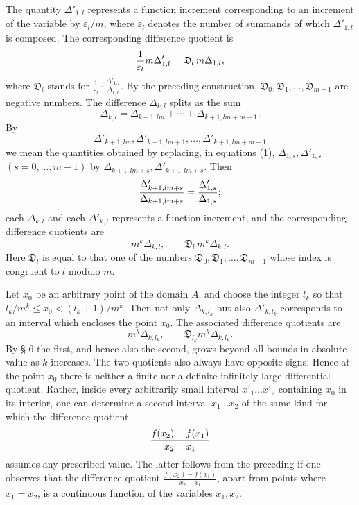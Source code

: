 The quantity $\Delta'_{1,l}$ represents a function increment corresponding to an increment of the variable by $\varepsilon_l/m$, where $\varepsilon_l$ denotes the number of summands of which $\Delta'_{1,l}$ is composed. The corresponding difference quotient is
\[
 {1\over\varepsilon_l}m\Delta'_{1,l}=\mathfrak D_l\,m\Delta_{1,l},
\]
where $\mathfrak D_l$ stands for $\frac1{\varepsilon_l}\cdot\frac{\Delta'_{1,l}}{\Delta_{1,l}}$. By the preceding construction, $\mathfrak D_0,\mathfrak D_1,\ldots,\mathfrak D_{m-1}$ are negative numbers. The difference $\Delta_{k,l}$ splits as the sum
\[
 \Delta_{k,l}=\Delta_{k+1,lm}+\cdots+\Delta_{k+1,lm+m-1}.
\]
By
\[
 \Delta'_{k+1,lm},\Delta'_{k+1,lm+1},\ldots,\Delta'_{k+1,lm+m-1}
\]
we mean the quantities obtained by replacing, in equations (1), $\Delta_{1,s},\Delta'_{1,s}$ $(s=0,
\ldots,m-1)$ by $\Delta_{k+1,lm+s},\Delta'_{k+1,lm+s}$. Then
\[
 {\Delta'_{k+1,lm+s}\over\Delta_{k+1,lm+s}}={\Delta'_{1,s}\over\Delta_{1,s}};
\]
each $\Delta_{k,l}$ and each $\Delta'_{k,l}$ represents a function increment, and the corresponding difference quotients are
\[
 m^k\Delta_{k,l},
 \qquad
 \mathfrak D_l\,m^k\Delta_{k,l}.
\]
Here $\mathfrak D_l$ is equal to that one of the numbers $\mathfrak D_0,\mathfrak D_1,\ldots,\mathfrak D_{m-1}$ whose index is congruent to $l$ modulo $m$.

Let $x_0$ be an arbitrary point of the domain $A$, and choose the integer $l_k$ so that $l_k/m^k\le x_0<(l_k+1)/m^k$. Then not only $\Delta_{k,l_k}$ but also $\Delta'_{k,l_k}$ corresponds to an interval which encloses the point $x_0$. The associated difference quotients are
\[
 m^k\Delta_{k,l_k},
 \qquad
 \mathfrak D_{l_k}m^k\Delta_{k,l_k}.
\]
By § 6 the first, and hence also the second, grows beyond all bounds in absolute value as $k$ increases. The two quotients also always have opposite signs. Hence at the point $x_0$ there is neither a finite nor a definite infinitely large differential quotient. Rather, inside every arbitrarily small interval $x'_1\ldots x'_2$ containing $x_0$ in its interior, one can determine a second interval $x_1\ldots x_2$ of the same kind for which the difference quotient
\[
 {f(x_2)-f(x_1)\over x_2-x_1}
\]
assumes any prescribed value. The latter follows from the preceding if one observes that the difference quotient $\frac{f(x_2)-f(x_1)}{x_2-x_1}$, apart from points where $x_1=x_2$, is a continuous function of the variables $x_1,x_2$.
